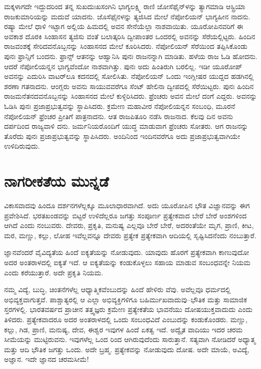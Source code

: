 ಮಕ್ಕಳಾಗದೇ ಇದ್ದುದರಿಂದ ತನ್ನ ಸುಖದುಃಖಸಂಗಿನಿ ಭಾಗ್ಯಲಕ್ಷ್ಮಿ ರಾಣಿ ಜೋಸೆಫೈನ್​ಳನ್ನು ತ್ಯಾಗಮಾಡಿ ಆಸ್ಟ್ರಿಯಾ ರಾಜಕುಮಾರಿಯನ್ನು ಮದುವೆ ಯಾದನು. ಜೊಸೆಫೈನಳನ್ನು ತ್ಯಜಿಸಿದ ಮೇಲೆ ನೆಪೋಲಿಯನ್​ ಭಾಗ್ಯಹೀನ ನಾದನು. ರಷ್ಯಾ ಮೇಲೆ ಧಾಳಿ ಇಟ್ಟಾಗ ಅಲ್ಲಿಯ ಹಿಮದಲ್ಲಿ ಅವನ ಸೇನೆಯೆಲ್ಲಾ ನಾಶವಾಯಿತು. ಯೂರೋಪಿನವರಿಗೆ ಈ ಅವಕಾಶ ದೊರಕಿ ಸಿಂಹಾಸನ ತ್ಯಜಿಸು ವಂತೆ ಬಲಾತ್ಕರಿಸಿ ದ್ವೀಪಾಂತರ ಒಂದರಲ್ಲಿ ಅವನನ್ನು ಸೆರೆಯಲ್ಲಿಟ್ಟರು. ಹಿಂದಿನ ರಾಜವಂಶಕ್ಕೆ ಸೇರಿದವನೊಬ್ಬನನ್ನು ಸಿಂಹಾಸನದ ಮೇಲೆ ಕೂರಿಸಿದರು. ನೆಪೋಲಿಯನ್​ ಸೆರೆಯಿಂದ ತಪ್ಪಿಸಿಕೊಂಡು ಪುನಃ ಫ್ರಾನ್ಸಿಗೆ ಬಂದನು. ಫ್ರಾನ್ಸ್​ ಆತನನ್ನು ಆಹ್ವಾನಿಸಿ ಪುನಃ ರಾಜನನ್ನಾಗಿ ಮಾಡಿತು. ಹಳೆಯ ರಾಜ ಓಡಿ ಹೋದನು. ಆದರೆ ನೆಪೋಲಿಯನ್ನನ ಭಾಗ್ಯವೆಂದೋ ನಾಶವಾಗಿತ್ತು. ಪುನಃ ಅದು ಹಿಂತಿರುಗಿ ಬರಲಿಲ್ಲ. ಇಡೀ ಯೂರೋಪ್​ ಅವನನ್ನು ಎದುರಿಸಿ ವಾಟರ್​ಲೂ ಕದನದಲ್ಲಿ ಸೋಲಿಸಿತು. ನೆಪೋಲಿಯನ್​ ಒಂದು ಇಂಗ್ಲೀಷರ ಯುದ್ದದ ಹಡಗಿನಲ್ಲಿ ಶರಣಾ ಗತನಾದನು. ಆಂಗ್ಲರು ಅವನು ಸಾಯುವವರೆಗೂ ಸೆಂಟ್​ ಹೇಲಿನಾ ದ್ವೀಪದಲ್ಲಿ ಸೆರೆಯಿಟ್ಟರು. ಪುನಃ ಹಿಂದಿನ ರಾಜಮನೆತನದವನೊಬ್ಬನನ್ನು ಸಿಂಹಾಸನದ ಮೇಲೆ ಕುಳ್ಳಿರಿಸಿದರು. ಫ್ರೆಂಚರು ಅವನ ಮೇಲೆ ದಂಗೆ ಎದ್ದರು. ಅವನನ್ನು ಓಡಿಸಿ ಪುನಃ ಪ್ರಜಾಪ್ರಭುತ್ವವನ್ನು ಸ್ಥಾಪಿಸಿದರು. ಕ್ರಮೇಣ ಮಹಾವೀರ ನೆಪೋಲಿಯನ್ನನ ಸಂಬಂಧಿ, ಮೂರನೆ ನೆಪೋಲಿಯನ್​ ಫ್ರೆಂಚರ ಪ್ರೀತಿಗೆ ಪಾತ್ರನಾದನು. ಆತ ರಾಜಪಿತೂರಿ ನಡೆಸಿ ರಾಜನಾದ. ಕೆಲವು ದಿನ ಅವನು ದರ್ಪದಿಂದ ರಾಜ್ಯವಾಳಿ ದನು. ಜರ್ಮನಿಯರೊಂದಿಗೆ ಯುದ್ಧ ಮಾಡುವಾಗ ಫ್ರೆಂಚರು ಸೋತರು. ಆಗ ರಾಜನನ್ನು ತೊರೆದು ಪುನಃ ಪ್ರಜಾಪ್ರಭುತ್ವವನ್ನು ಸ್ಥಾಪಿಸಿದರು. ಅಂದಿನಿಂದ ಇಂದಿನವರೆಗೂ ಅದು ಪ್ರಜಾಪ್ರಭುತ್ವವಾಗಿಯೇ ಉಳಿದಿರುವುದು.


\section{ನಾಗರೀಕತೆಯ ಮುನ್ನಡೆ}

ವಿಕಾಸವಾದವು ಹಿಂದೂ ದರ್ಶನಗಳೆಲ್ಲಕ್ಕೂ ಮೂಲಾಧಾರವಾಗಿದೆ. ಅದು ಯೂರೋಪಿನ ಭೌತ ವಿಜ್ಞಾನವನ್ನು ಈಗ ಪ್ರವೇಶಿಸಿದೆ. ಭರತಖಂಡವನ್ನು ಬಿಟ್ಟರೆ ಉಳಿದೆಲ್ಲರೂ ಜಗತ್ತು ಸಂಪೂರ್ಣ ಪ್ರತ್ಯೇಕವಾದ ಬೇರೆ ಬೇರೆ ಅಂಶಗಳಿಂದ ಆಗಿದೆ ಎಂದು ನಂಬುವರು. ದೇವರು, ಪ್ರಕೃತಿ, ಮನುಷ್ಯ ಎಲ್ಲವೂ ಬೇರೆ ಬೇರೆ, ಅದರಂತೆಯೇ ಮೃಗ, ಪ್ರಾಣಿ, ಕೀಟ, ಮರ, ಮಣ್ಣು, ಕಲ್ಲು, ಲೋಹ ಇವೆಲ್ಲವನ್ನೂ ದೇವರು ಪ್ರತ್ಯೇಕ ಪ್ರತ್ಯೇಕವಾಗಿ ಆದಿಯಲ್ಲಿ ಸೃಷ್ಟಿಸಿದನೆಂದು ನಂಬುತ್ತಾರೆ.

ಜ್ಞಾನವೆಂದರೆ ವೈವಿದ್ಯತೆಯ ಹಿಂದೆ ಐಕ್ಯತೆಯನ್ನು ನೋಡುವುದು. ಯಾವುದು ಹೊರಗೆ ಪ್ರತ್ಯೇಕವಾಗಿ ಕಾಣುವುದೋ ಅದರ ಅಂತರಾಳದಲ್ಲಿ ಐಕ್ಯತೆ ಇದೆ. ಆ ಐಕ್ಯತೆಯನ್ನು ಕಂಡುಕೊಳ್ಳಲು ಸಹಾಯ ಮಾಡುವ ಸಂಬಂಧವನ್ನೇ ನಿಯಮ ಎಂದು ಕರೆಯುತ್ತಾರೆ. ಅದೇ ಪ್ರಕೃತಿ ನಿಯಮ.

ನಮ್ಮ ವಿದ್ಯೆ, ಬುದ್ಧಿ, ಚಿಂತನೆಗಳೆಲ್ಲ ಆಧ್ಯಾತ್ಮಿಕವೆಂಬುದನ್ನು ಹಿಂದೆ ಹೇಳಿರು ವೆವು. ಅವೆಲ್ಲವೂ ಧರ್ಮದಲ್ಲಿ ಅಭಿವ್ಯಕ್ತವಾಗುತ್ತವೆ. ಪಾಶ್ಚಾತ್ಯರಲ್ಲಿ ಆ ಎಲ್ಲಾ ಅಭಿವ್ಯಕ್ತಿಗಳಿಗೂ ಬಹಿರ್ಮುಖವಾದುವು–ಭೌತಿಕ ಮತ್ತು ಸಾಮಾಜಿಕ ಸ್ತರಗಳಲ್ಲಿ. ಭಾರತವರ್ಷದ ಪ್ರಾಚೀನ ತತ್ತ್ವಜ್ಞರು ಕ್ರಮೇಣ ಪ್ರತ್ಯೇಕತೆಯ ಭಾವನೆಯು ದೋಷಯುಕ್ತವಾದುದು ಎಂದು ತಿಳಿದರು. ಪ್ರತ್ಯೇಕವಾದರೂ ಅದರ ಅಂತರಾಳದಲ್ಲಿ ಒಂದು ಸಂಬಂಧವಿದೆ ಎಂಬುದನ್ನು ಕಂಡುಕೊಂಡರು. ಮಣ್ಣು, ಕಲ್ಲು, ಗಿಡ, ಪ್ರಾಣಿ, ಮನುಷ್ಯ, ದೇವ, ಈಶ್ವರ ಇವುಗಳ ಹಿಂದೆ ಏಕತ್ವ ಇದೆ. ಅದ್ವೈತ ವಾದಿಯು ಇದರ ಚರಮ ಸೀಮೆಯನ್ನು ಮುಟ್ಟಿರುವನು. ಇವುಗಳೆಲ್ಲ ಒಂದ ರಿಂದ ಆಗಿರುವುದೆಂದು ಸಾರುತ್ತಾನೆ. ಸತ್ಯವಾಗಿ ನೋಡಿದರೆ ಅಧ್ಯಾತ್ಮ ಮತ್ತು ಆದಿ ಭೌತಿಕ ಜಗತ್ತು ಒಂದು. ಅದೇ ಬ್ರಹ್ಮ. ಪ್ರತ್ಯೇಕವನ್ನು ನೋಡುವುದು ದೋಷ. ಅದೇ ಮಾಯೆ, ಅವಿದ್ಯೆ, ಅಜ್ಞಾನ. ಇದೇ ಜ್ಞಾನದ ಚರಮಸೀಮೆ!

